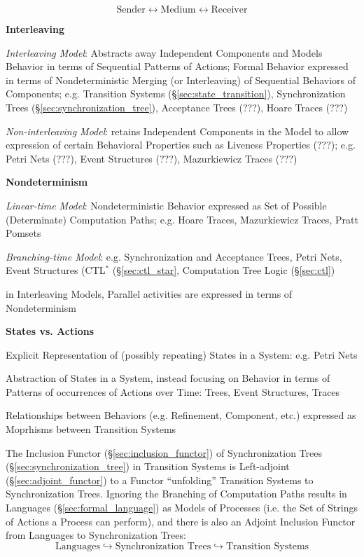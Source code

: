 \[
  \text{Sender} \leftrightarrow \text{Medium}
    \leftrightarrow \text{Receiver}
\]


\textbf{Interleaving}

\emph{Interleaving Model}: Abstracts away Independent Components and
Models Behavior in terms of Sequential Patterns of Actions; Formal
Behavior expressed in terms of Nondeterministic Merging (or
Interleaving) of Sequential Behaviors of Components; e.g. Transition
Systems (\S\ref{sec:state_transition}), Synchronization Trees
(\S\ref{sec:synchronization_tree}), Acceptance Trees (???), Hoare
Traces (???) %

\emph{Non-interleaving Model}: retains Independent Components in the
Model to allow expression of certain Behavioral Properties such as
Liveness Properties (???); e.g. Petri Nets (???), Event Structures
(???), Mazurkiewicz Traces (???)


\textbf{Nondeterminism}

\emph{Linear-time Model}: Nondeterministic Behavior expressed as Set of
Possible (Determinate) Computation Paths; e.g. Hoare Traces,
Mazurkiewicz Traces, Pratt Pomsets

\emph{Branching-time Model}: e.g. Synchronization and Acceptance
Trees, Petri Nets, Event Structures (CTL$^*$ (\S\ref{sec:ctl_star},
Computation Tree Logic (\S\ref{sec:ctl})


in Interleaving Models, Parallel activities are expressed in terms of
Nondeterminism


\textbf{States vs. Actions}

Explicit Representation of (possibly repeating) States in a System:
e.g. Petri Nets

Abstraction of States in a System, instead focusing on Behavior in
terms of Patterns of occurrences of Actions over Time: Trees, Event
Structures, Traces


Relationships between Behaviors (e.g. Refinement, Component, etc.)
expressed as Moprhisms between Transition Systems

The Inclusion Functor (\S\ref{sec:inclusion_functor}) of
Synchronization Trees (\S\ref{sec:synchronization_tree}) in Transition
Systems is Left-adjoint (\S\ref{sec:adjoint_functor}) to a Functor
``unfolding'' Transition Systems to Synchronization Trees. Ignoring
the Branching of Computation Paths results in Languages
(\S\ref{sec:formal_language}) as Models of Processes (i.e. the Set of
Strings of Actions a Process can perform), and there is also an
Adjoint Inclusion Functor from Languages to Synchronization Trees:
\[
  \text{Languages} \hookrightarrow \text{Synchronization Trees}
    \hookrightarrow \text{Transition Systems}
\]

